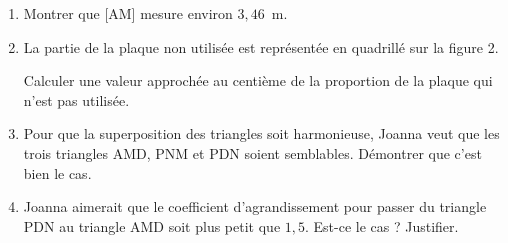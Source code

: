 \begin{enumerate}
\item Montrer que [AM] mesure environ $3,46$~m.
\item La partie de la plaque non utilisée est représentée en quadrillé sur la figure 2.

Calculer une valeur approchée au centième de la proportion de la plaque qui n'est pas utilisée.
\item  Pour que la superposition des triangles soit harmonieuse, Joanna veut que les trois triangles AMD, PNM et PDN soient semblables. Démontrer que c'est bien le cas.
\item Joanna aimerait que le coefficient d'agrandissement pour passer du triangle PDN au triangle AMD soit plus petit que $1,5$. Est-ce le cas ? Justifier.
\end{enumerate}

\bigskip

